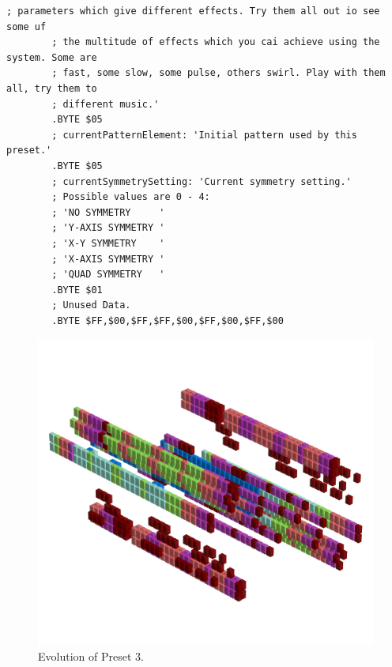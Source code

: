 \begin{lstlisting}[basicstyle=\tiny,caption=Source code for Preset 2.]
        ; parameters which give different effects. Try them all out io see some uf
        ; the multitude of effects which you cai achieve using the system. Some are
        ; fast, some slow, some pulse, others swirl. Play with them all, try them to
        ; different music.'
        .BYTE $05
        ; currentPatternElement: 'Initial pattern used by this preset.'
        .BYTE $05
        ; currentSymmetrySetting: 'Current symmetry setting.'
        ; Possible values are 0 - 4:
        ; 'NO SYMMETRY     '
        ; 'Y-AXIS SYMMETRY '
        ; 'X-Y SYMMETRY    '
        ; 'X-AXIS SYMMETRY '
        ; 'QUAD SYMMETRY   '
        .BYTE $01
        ; Unused Data.
        .BYTE $FF,$00,$FF,$FF,$00,$FF,$00,$FF,$00
\end{lstlisting}


\clearpage                                                                 
\begin{figure}[H]                                                          
    \centering                                                             
    \begin{adjustbox}{width=14cm,center}                                   
      \includegraphics[width=14cm]{src/presets/pattern3-45.png}%
    \end{adjustbox}                                                        
\caption{Evolution of Preset 3.}                                           
\end{figure}                                                               
\clearpage                                                                 
                                                                           
